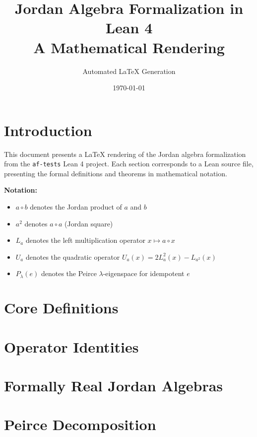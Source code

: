 \documentclass[11pt,a4paper]{report}
\title{Jordan Algebra Formalization in Lean 4\\[0.5em]\large A Mathematical Rendering}
\author{Automated LaTeX Generation}
\date{\today}
\theoremstyle{definition}
\newcommand{\jmul}{\circ}           %
\newcommand{\jsq}[1]{#1^{2}}        %
\newcommand{\Lop}[1]{L_{#1}}        %
\newcommand{\Uop}[1]{U_{#1}}        %
\newcommand{\Peirce}[2]{P_{#2}(#1)} %
\begin{document}
\maketitle

\tableofcontents

\chapter{Introduction}

This document presents a LaTeX rendering of the Jordan algebra formalization
from the \texttt{af-tests} Lean 4 project. Each section corresponds to a Lean
source file, presenting the formal definitions and theorems in mathematical notation.

\textbf{Notation:}
\begin{itemize}
  \item $a \jmul b$ denotes the Jordan product of $a$ and $b$
  \item $\jsq{a}$ denotes $a \jmul a$ (Jordan square)
  \item $\Lop{a}$ denotes the left multiplication operator $x \mapsto a \jmul x$
  \item $\Uop{a}$ denotes the quadratic operator $\Uop{a}(x) = 2\Lop{a}^2(x) - \Lop{\jsq{a}}(x)$
  \item $\Peirce{e}{\lambda}$ denotes the Peirce $\lambda$-eigenspace for idempotent $e$
\end{itemize}

\chapter{Core Definitions}





\chapter{Operator Identities}




\chapter{Formally Real Jordan Algebras}






\chapter{Peirce Decomposition}



\end{document}
